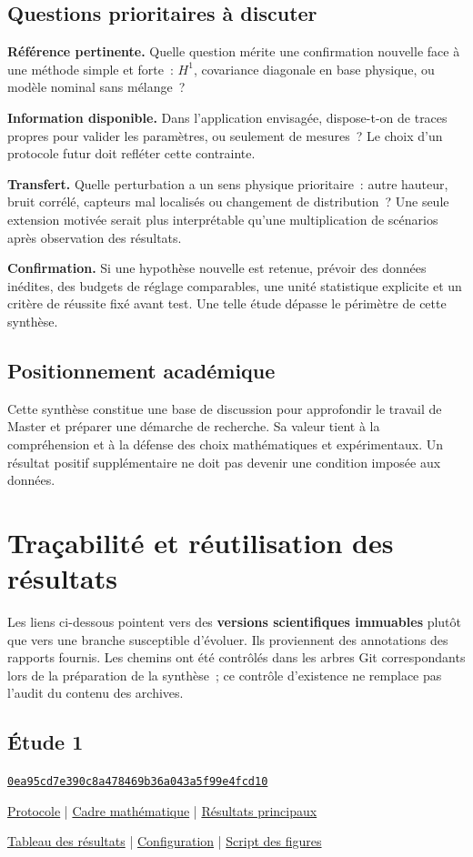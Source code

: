 \documentclass[11pt,a4paper]{article}
\newcommand{\repo}{https://github.com/halhoulmhamed-droid/inverse-laplace-learning}
\newcommand{\shaone}{0ea95cd7e390c8a478469b36a043a5f99e4fcd10}
\newcommand{\gitlink}[3]{\href{\repo/blob/#1/#2}{#3}}
\begin{document}
\subsection*{Questions prioritaires à discuter}
\textbf{Référence pertinente.} Quelle question mérite une confirmation nouvelle face à une
méthode simple et forte~: $H^1$, covariance diagonale en base physique, ou modèle nominal sans mélange~?

\textbf{Information disponible.} Dans l'application envisagée, dispose-t-on de traces propres
pour valider les paramètres, ou seulement de mesures~? Le choix d'un protocole futur doit
refléter cette contrainte.

\textbf{Transfert.} Quelle perturbation a un sens physique prioritaire~: autre hauteur,
bruit corrélé, capteurs mal localisés ou changement de distribution~? Une seule extension
motivée serait plus interprétable qu'une multiplication de scénarios après observation des résultats.

\textbf{Confirmation.} Si une hypothèse nouvelle est retenue, prévoir des données inédites,
des budgets de réglage comparables, une unité statistique explicite et un critère de réussite
fixé avant test. Une telle étude dépasse le périmètre de cette synthèse.

\subsection*{Positionnement académique}
Cette synthèse constitue une base de discussion pour approfondir le travail de Master et
préparer une démarche de recherche. Sa valeur tient à la compréhension et à la défense
des choix mathématiques et expérimentaux. Un résultat positif supplémentaire ne doit pas
devenir une condition imposée aux données.

\newpage
\section{Traçabilité et réutilisation des résultats}
Les liens ci-dessous pointent vers des \textbf{versions scientifiques immuables} plutôt que vers
une branche susceptible d'évoluer. Ils proviennent des annotations des rapports fournis.
Les chemins ont été contrôlés dans les arbres Git correspondants lors de la préparation de
la synthèse~; ce contrôle d'existence ne remplace pas l'audit du contenu des archives.

\subsection*{Étude 1}
\href{\repo/tree/\shaone}{\texttt{\shaone}}\par
\gitlink{\shaone}{docs/protocol.md}{Protocole} \enspace | \enspace
\gitlink{\shaone}{docs/theory.md}{Cadre mathématique} \enspace | \enspace
\gitlink{\shaone}{results/analysis/primary.json}{Résultats principaux}\par
\gitlink{\shaone}{results/analysis/summary.csv}{Tableau des résultats} \enspace | \enspace
\gitlink{\shaone}{results/full/configuration.json}{Configuration} \enspace | \enspace
\gitlink{\shaone}{scripts/figures.py}{Script des figures}
\end{document}
